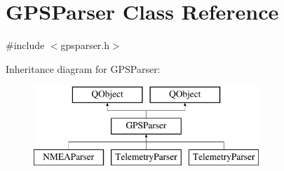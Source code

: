 \hypertarget{class_g_p_s_parser}{\section{G\-P\-S\-Parser Class Reference}
\label{class_g_p_s_parser}
}


{\ttfamily \#include $<$gpsparser.\-h$>$}

Inheritance diagram for G\-P\-S\-Parser\-:\begin{figure}[H]
\begin{center}
\leavevmode
\includegraphics[height=3.000000cm]{class_g_p_s_parser}
\end{center}
\end{figure}
